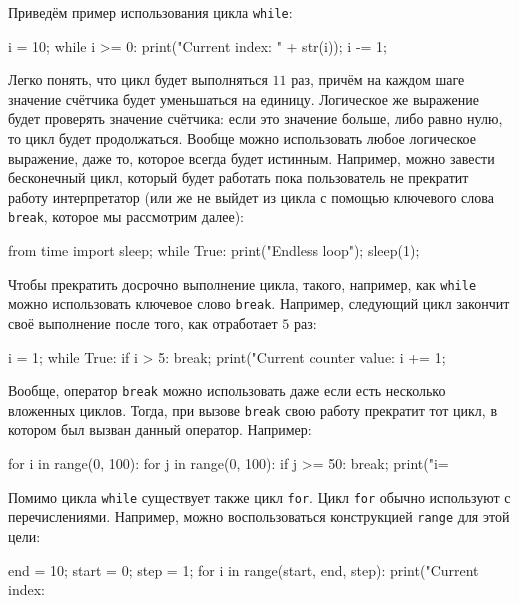 Приведём пример использования цикла \texttt{while}:

\begin{python}
i = 10;
while i >= 0:
  print("Current index: " + str(i));
  i -= 1;
\end{python}

Легко понять, что цикл будет выполняться $11$ раз, причём
на каждом шаге значение счётчика будет уменьшаться на 
единицу. Логическое же выражение будет проверять значение 
счётчика: если это значение больше, либо равно нулю, то цикл
будет продолжаться. Вообще можно использовать любое логическое 
выражение, даже то, которое всегда будет истинным. Например, 
можно завести бесконечный цикл, который будет работать пока 
пользователь не прекратит работу интерпретатор (или же не выйдет
из цикла с помощью ключевого слова \texttt{break}, которое мы 
рассмотрим далее):

\begin{python}
from time import sleep;
while True:
  print("Endless loop");
  sleep(1);
\end{python}

Чтобы прекратить досрочно выполнение цикла, такого, например, как
\texttt{while} можно использовать ключевое слово \texttt{break}.
Например, следующий цикл закончит своё выполнение после того, как
отработает $5$ раз:

\begin{python}
i = 1;
while True:
  if i > 5:
  	break;
  print("Current counter value: %
  i += 1;
\end{python}

Вообще, оператор \texttt{break} можно использовать даже если есть 
несколько вложенных циклов. Тогда, при вызове \texttt{break} свою 
работу прекратит тот цикл, в котором был вызван данный оператор. 
Например:

\begin{python}
for i in range(0, 100):
	for j in range(0, 100):
		if j >= 50:
			break;
		print("i=%
\end{python} 

Помимо цикла \texttt{while} существует также цикл \texttt{for}.
Цикл \texttt{for} обычно используют с перечислениями. Например,
можно воспользоваться конструкцией \texttt{range} для этой цели:

\begin{python}
end = 10;
start = 0;
step = 1;
for i in range(start, end, step):
  print("Current index: %
\end{python}


